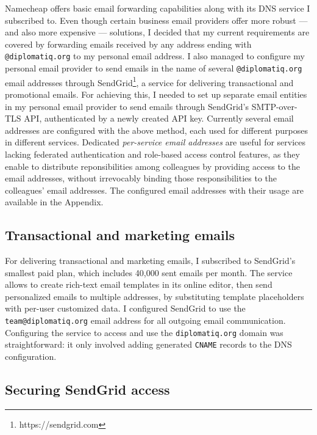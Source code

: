 Namecheap offers basic email forwarding capabilities along with its DNS service I subscribed to. Even though certain business email providers offer more robust — and also more expensive — solutions, I decided that my current requirements are covered by forwarding emails received by any address ending with \lstinline{@diplomatiq.org} to my personal email address. I also managed to configure my personal email provider to send emails in the name of several \lstinline{@diplomatiq.org} email addresses through SendGrid\footnote{https://sendgrid.com}, a service for delivering transactional and promotional emails. For achieving this, I needed to set up separate email entities in my personal email provider to send emails through SendGrid's SMTP-over-TLS API, authenticated by a newly created API key. Currently several email addresses are configured with the above method, each used for different purposes in different services. Dedicated \emph{per-service email addresses} are useful for services lacking federated authentication and role-based access control features, as they enable to distribute reponsibilities among colleagues by providing access to the email addresses, without irrevocably binding those responsibilities to the colleagues' email addresses. The configured email addresses with their usage are available in the Appendix.

\subsection{Transactional and marketing emails}

For delivering transactional and marketing emails, I subscribed to SendGrid's smallest paid plan, which includes 40,000 sent emails per month. The service allows to create rich-text email templates in its online editor, then send personalized emails to multiple addresses, by substituting template placeholders with per-user customized data. I configured SendGrid to use the \lstinline{team@diplomatiq.org} email address for all outgoing email communication. Configuring the service to access and use the \lstinline{diplomatiq.org} domain was straightforward: it only involved adding generated \lstinline{CNAME} records to the DNS configuration.

\subsection{Securing SendGrid access}


